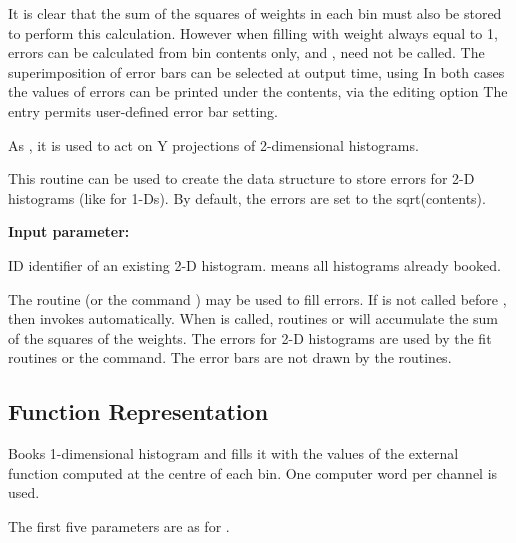 It is clear that the sum of the squares of weights in each
bin must also be stored to perform this calculation. However
when filling with weight always equal to 1, errors can be
calculated from bin contents only, and , 
need not be called. 
The superimposition of error bars can be selected at output time, using
In both cases the values of errors can be printed under the contents,
via the editing option 
The entry  permits user-defined error bar setting.
\medskip

\Action As , it is used to act on Y
projections of 2-dimensional histograms.

\Action 
    This routine can be used to create the data structure to store errors
    for 2-D histograms (like  for 1-Ds). 
    By default, the errors are set to the sqrt(contents).

\begin{DLttc}{12}
\item[{\rm\bf Input parameter:}]
\item[ID] identifier of an existing 2-D histogram.
           means all histograms already booked.
\end{DLttc}

The routine  (or the \PAW{} command ) 
may be used to fill errors. 
If  is not called before , then 
invokes  automatically. 
When  is called, routines  or  
will accumulate the sum of the squares of the weights.
The errors for 2-D histograms are used by the fit routines 
or the  command.
The error bars are not drawn by the \HPLOT{} routines.
 
\subsection{Function Representation}
\label{HFUNCREP}

 
\Action Books 1-dimensional histogram and fills it with the values of the
external function  computed at the centre of each bin.
One computer word per channel is used.
 
The first five parameters are as for .

